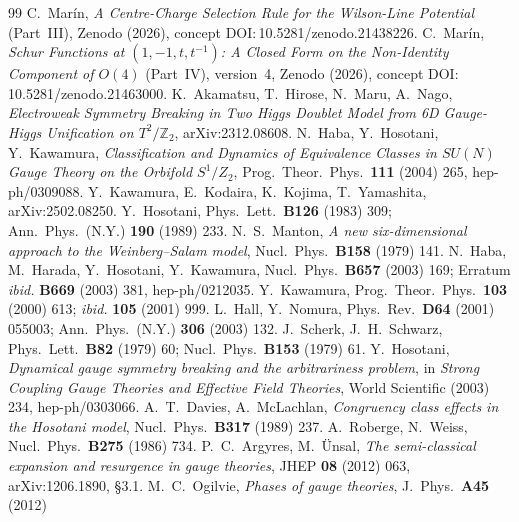 \documentclass[11pt,a4paper]{article}
\newcommand{\ZZ}{\mathbb{Z}}
\begin{document}
\begin{thebibliography}{99}\small      %
\setlength{\itemsep}{0pt plus 1pt}     %
\setlength{\parsep}{0pt}
 C.~Mar\'in, \emph{A Centre-Charge Selection Rule for the Wilson-Line Potential}
(Part~III), Zenodo (2026), concept DOI:\,10.5281/zenodo.21438226.
 C.~Mar\'in, \emph{Schur Functions at $(1,-1,t,t^{-1})$: A Closed Form on the
Non-Identity Component of $O(4)$} (Part~IV), version~4, Zenodo (2026), concept
DOI:\,10.5281/zenodo.21463000.
 K.~Akamatsu, T.~Hirose, N.~Maru, A.~Nago, \emph{Electroweak Symmetry Breaking in Two
Higgs Doublet Model from 6D Gauge-Higgs Unification on $T^2/\ZZ_2$}, arXiv:2312.08608.
 N.~Haba, Y.~Hosotani, Y.~Kawamura, \emph{Classification and Dynamics of Equivalence
Classes in $SU(N)$ Gauge Theory on the Orbifold $S^1/Z_2$}, Prog.\ Theor.\ Phys.\ \textbf{111}
(2004) 265, hep-ph/0309088.
 Y.~Kawamura, E.~Kodaira, K.~Kojima, T.~Yamashita, arXiv:2502.08250.
 Y.~Hosotani, Phys.\ Lett.\ \textbf{B126} (1983) 309; Ann.\ Phys.\ (N.Y.)
\textbf{190} (1989) 233.
 N.~S.~Manton, \emph{A new six-dimensional approach to the Weinberg--Salam model},
Nucl.\ Phys.\ \textbf{B158} (1979) 141.
 N.~Haba, M.~Harada, Y.~Hosotani, Y.~Kawamura, Nucl.\ Phys.\ \textbf{B657} (2003) 169;
Erratum \emph{ibid.} \textbf{B669} (2003) 381, hep-ph/0212035.
 Y.~Kawamura, Prog.\ Theor.\ Phys.\ \textbf{103} (2000) 613; \emph{ibid.}
\textbf{105} (2001) 999.
 L.~Hall, Y.~Nomura, Phys.\ Rev.\ \textbf{D64} (2001) 055003; Ann.\ Phys.\ (N.Y.)
\textbf{306} (2003) 132.
 J.~Scherk, J.~H.~Schwarz, Phys.\ Lett.\ \textbf{B82} (1979) 60; Nucl.\ Phys.\
\textbf{B153} (1979) 61.
 Y.~Hosotani, \emph{Dynamical gauge symmetry breaking and the arbitrariness
problem}, in \emph{Strong Coupling Gauge Theories and Effective Field Theories}, World Scientific
(2003) 234, hep-ph/0303066.
 A.~T.~Davies, A.~McLachlan, \emph{Congruency class effects in the Hosotani model},
Nucl.\ Phys.\ \textbf{B317} (1989) 237.
 A.~Roberge, N.~Weiss, Nucl.\ Phys.\ \textbf{B275} (1986) 734.
\bibitem{ArgyresUnsal} P.~C.~Argyres, M.~\"Unsal, \emph{The semi-classical expansion and resurgence
in gauge theories}, JHEP \textbf{08} (2012) 063, arXiv:1206.1890, \S3.1.
\bibitem{Ogilvie} M.~C.~Ogilvie, \emph{Phases of gauge theories}, J.\ Phys.\ \textbf{A45} (2012)

\end{thebibliography}
\end{document}
